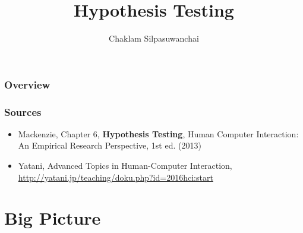 \documentclass{beamer}
\title[Hypothesis Testing]{Hypothesis Testing} %
\author{Chaklam Silpasuwanchai} %
\institute[AIT] %
{
Asian Institute of Technology \\ %
\medskip
\textit{chaklam@ait.asia} %
}
\date{} %
\begin{document}
\begin{frame}
\titlepage %
\end{frame}

\begin{frame}
\frametitle{Overview} %
\tableofcontents
\end{frame}


\begin{frame}
\frametitle{Sources} 
\begin{itemize}
	\item Mackenzie, Chapter 6, \textbf{Hypothesis Testing},  Human Computer Interaction: An Empirical Research Perspective, 1st ed. (2013) 
	\item Yatani, Advanced Topics in Human-Computer Interaction, \url{http://yatani.jp/teaching/doku.php?id=2016hci:start}
\end{itemize}
\end{frame}



\section{Big Picture} %
\end{document}
